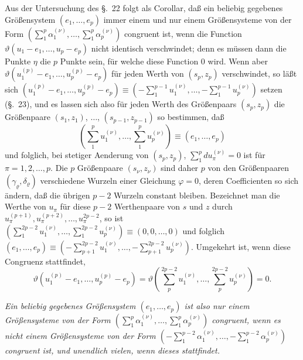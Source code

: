 \documentclass{article}
\begin{document}
Aus der Untersuchung des §.~22 folgt als Corollar, daß ein beliebig gegebenes Größensystem $(e_{1}, \ldots, e_{p})$ immer einem und nur einem Größensysteme von der Form $\left(\displaystyle\sum_{1}^{p} \alpha_{1}^{(\nu)}, \ldots, \sum_{1}^{p} \alpha_{p}^{(\nu)}\right)$ congruent ist, wenn die Function $\vartheta(u_{1}-e_{1}, \ldots, u_{p}-e_{p})$ nicht identisch verschwindet; denn es müssen dann die Punkte $\eta$ die $p$ Punkte sein, für welche diese Function 0 wird. Wenn aber $\vartheta(u_{1}^{(p)}-e_{1}, \ldots, u_{p}^{(p)}-e_{p})$ für jeden Werth von $(s_{p}, z_{p})$ verschwindet, so läßt sich $(u_{1}^{(p)}-e_{1}, \ldots, u_{p}^{(p)}-e_{p}) \equiv \left(-\displaystyle\sum_{1}^{p-1} u_{1}^{(\nu)}, \ldots, -\sum_{1}^{p-1} u_{p}^{(\nu)}\right)$ setzen (§.~23), und es lassen sich also für jeden Werth des Größenpaars $(s_{p}, z_{p})$ die Größenpaare $(s_{1}, z_{1})$, $\ldots$, $(s_{p-1}, z_{p-1})$ so bestimmen, daß
\[ \left(\sum_{1}^{p} u_{1}^{(\nu)}, \ldots, \sum_{1}^{p} u_{p}^{(\nu)}\right) \equiv (e_{1}, \ldots, e_{p}) \]
und folglich, bei stetiger Aenderung von $(s_{p}, z_{p})$, $\displaystyle\sum_{1}^{p} du_{\pi}^{(\nu)} = 0$ ist für $\pi = 1, 2, \ldots, p$. Die $p$ Größenpaare $(s_{\nu}, z_{\nu})$ sind daher $p$ von den Größenpaaren $(\gamma_{\varrho}, \delta_{\varrho})$ verschiedene Wurzeln einer Gleichung $\varphi = 0$, deren Coefficienten so sich ändern, daß die übrigen $p-2$ Wurzeln constant bleiben. Bezeichnet man die Werthe von $u_{\pi}$ für diese $p-2$ Werthenpaare von $s$ und $z$ durch $u_{\pi}^{(p+1)}, u_{\pi}^{(p+2)}, \ldots, u_{\pi}^{2p-2}$, so ist $\left(\displaystyle\sum_{1}^{2p-2} u_{1}^{(\nu)}, \ldots, \sum_{1}^{2p-2} u_{p}^{(\nu)}\right) \equiv (0, 0, \ldots, 0)$ und folglich $(e_{1}, \ldots, e_{p}) \equiv \left(-\displaystyle\sum_{p+1}^{2p-2} u_{1}^{(\nu)}, \ldots, -\sum_{p+1}^{2p-2} u_{p}^{(\nu)}\right)$. Umgekehrt ist, wenn diese Congruenz stattfindet,
\[ \vartheta(u_{1}^{(p)}-e_{1}, \ldots, u_{p}^{(p)}-e_{p}) = \vartheta\left(\sum_{p}^{2p-2} u_{1}^{(\nu)}, \ldots, \sum_{p}^{2p-2} u_{p}^{(\nu)}\right) = 0. \]

\emph{Ein beliebig gegebenes Größensystem $(e_{1}, \ldots, e_{p})$ ist also nur einem Größensysteme von der Form $\left(\displaystyle\sum_{1}^{p} \alpha_{1}^{(\nu)}, \ldots, \sum_{1}^{p} \alpha_{p}^{(\nu)}\right)$ congruent, wenn es nicht einem Größensysteme von der Form $\left(-\displaystyle\sum_{1}^{p-2} \alpha_{1}^{(\nu)}, \ldots, -\sum_{1}^{p-2} \alpha_{p}^{(\nu)}\right)$ congruent ist, und unendlich vielen, wenn dieses stattfindet.}
\end{document}
